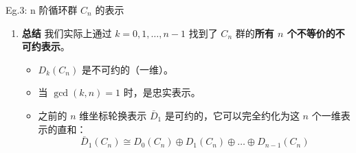 \begin{example}{Eg.3: n 阶循环群 $C_n$ 的表示}
\begin{enumerate}
    \textbf{忠实性讨论 (通过同态核判别)}：
    表示是忠实的 $\iff$ 同态核 $I = \{e\}$ (单射)。
    若同态核包含除 $e$ 以外的元素，说明有多个群元映射到了单位元 $1$，即“多对一”，故非忠实。
    
    考察同态核 $I_k = \{ a^m \in C_n \mid D_k(a^m) = 1 \}$：
    \begin{equation}
        e^{i \frac{2\pi k m}{n}} = 1 \implies \frac{km}{n} \in \mathbb{Z} \implies n \mid km
    \end{equation}
    其中 $1 \le m \le n$。
    \begin{itemize}
        \item \textbf{情形 1：$\gcd(k, n) = 1$ (k 与 n 互质)}
        若 $n$ 与 $k$ 互质，要使 $n \mid km$，必须有 $n \mid m$。在 $1 \le m \le n$ 范围内，只有 $m=n$（即 $a^n=e$）。
        故核 $I_k = \{e\}$。同态是“一对一”的。
        $\implies$ \textbf{忠实表示}。
        
        \item \textbf{情形 2：$\gcd(k, n) = d > 1$}
        此时 $n$ 和 $k$ 有公因子 $d$。取 $m = n/d$。显然 $m < n$ (即 $a^m \neq e$)。
        验证：$\frac{k m}{n} = \frac{k (n/d)}{n} = \frac{k}{d}$。因为 $d \mid k$，所以 $k/d$ 是整数，满足条件。
        故存在非恒元 $a^{n/d}$ 在核内。核 $I_k$ 非平庸。
        根据同构定理 $G/I \cong D(G)$，这是一个“$|I|$ 对 1”的同态。
        $\implies$ \textbf{非忠实表示}。
    \end{itemize}
    
    \textbf{特别例子}：
    \begin{itemize}
        \item $k=0$: $D_0(a)=1$。核为 $C_n$ 全体。平庸表示，非忠实。
        \item $k=1$: $\gcd(1, n)=1$。忠实表示。
        \item 设 $n=4, k=2$: $\gcd(4,2)=2 \neq 1$。$D_2(a) = e^{i\pi} = -1$, $D_2(a^2) = 1$。核包含 $a^2$。非忠实。
    \end{itemize}

        \item \textbf{总结}
    我们实际上通过 $k=0, 1, \dots, n-1$ 找到了 $C_n$ 群的\textbf{所有 $n$ 个不等价的不可约表示}。
    \begin{itemize}
        \item $D_k(C_n)$ 是不可约的（一维）。
        \item 当 $\gcd(k, n)=1$ 时，是忠实表示。
        \item 之前的 $n$ 维坐标轮换表示 $\bar{D}_1$ 是可约的，它可以完全约化为这 $n$ 个一维表示的直和：
        \begin{equation}
            \bar{D}_1(C_n) \cong D_0(C_n) \oplus D_1(C_n) \oplus \dots \oplus D_{n-1}(C_n)
        \end{equation}
    \end{itemize}
        \end{enumerate}
\end{example}


